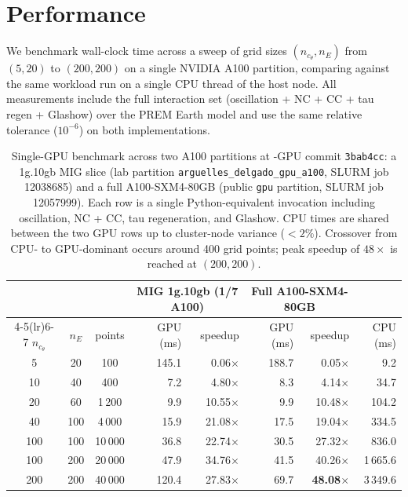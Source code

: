 \section{Performance}
\label{sec:performance}

We benchmark wall-clock time across a sweep of grid sizes
$(n_{c_\theta}, n_E)$ from $(5, 20)$ to $(200, 200)$ on a single
NVIDIA A100 partition, comparing against the same workload run on a
single CPU thread of the host node. All measurements include the full
interaction set (oscillation + NC + CC + tau regen + Glashow) over
the PREM Earth model and use the same relative tolerance
($10^{-6}$) on both implementations.

\begin{table}[t]
\centering
\small
\begin{tabular}{c c c r r r r r}
\toprule
& & & \multicolumn{2}{c}{MIG 1g.10gb (1/7 A100)} & \multicolumn{2}{c}{Full A100-SXM4-80GB} & \\
\cmidrule(lr){4-5}\cmidrule(lr){6-7}
$n_{c_\theta}$ & $n_E$ & points &
  GPU (ms) & speedup &
  GPU (ms) & speedup &
  CPU (ms) \\
\midrule
5   & 20  &    100 & 145.1 & 0.06$\times$ & 188.7 & 0.05$\times$ &      9.2 \\
10  & 40  &    400 &   7.2 & 4.80$\times$ &   8.3 & 4.14$\times$ &     34.7 \\
20  & 60  &  1\,200 &   9.9 & 10.55$\times$ &   9.9 & 10.48$\times$ &    104.2 \\
40  & 100 &  4\,000 &  15.9 & 21.08$\times$ &  17.5 & 19.04$\times$ &    334.5 \\
100 & 100 & 10\,000 &  36.8 & 22.74$\times$ &  30.5 & 27.32$\times$ &    836.0 \\
100 & 200 & 20\,000 &  47.9 & 34.76$\times$ &  41.5 & 40.26$\times$ &  1\,665.6 \\
200 & 200 & 40\,000 & 120.4 & 27.83$\times$ &  69.7 & \textbf{48.08$\times$} &  3\,349.6 \\
\bottomrule
\end{tabular}
\caption{Single-GPU benchmark across two A100 partitions at
\nusquids-GPU commit \texttt{3bab4cc}: a 1g.10gb MIG slice (lab partition
\texttt{arguelles\_delgado\_gpu\_a100}, SLURM job 12038685) and a full
A100-SXM4-80GB (public \texttt{gpu} partition, SLURM job 12057999).
Each row is a single Python-equivalent invocation including
oscillation, NC + CC, tau regeneration, and Glashow. CPU times are
shared between the two GPU rows up to cluster-node variance ($<\!2\%$).
Crossover from CPU- to GPU-dominant occurs around 400 grid points;
peak speedup of $48\times$ is reached at $(200, 200)$.}
\label{tab:bench_a100}
\end{table}

